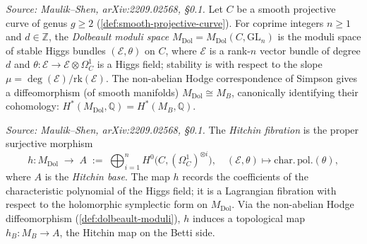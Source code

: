 \begin{definition}[DolbeaultModuli]
  \label{def:dolbeault-moduli}
  \textit{Source: Maulik--Shen, arXiv:2209.02568, §0.1.}
  Let $C$ be a smooth projective curve of genus $g \geq 2$ (\cref{def:smooth-projective-curve}).
  For coprime integers $n \geq 1$ and $d \in \mathbb{Z}$, the \emph{Dolbeault moduli space}
  $M_{\mathrm{Dol}} = M_{\mathrm{Dol}}(C, \mathrm{GL}_n)$ is the moduli space of stable Higgs
  bundles $(\mathcal{E}, \theta)$ on $C$, where $\mathcal{E}$ is a rank-$n$ vector bundle of
  degree $d$ and $\theta \colon \mathcal{E} \to \mathcal{E} \otimes \Omega^1_C$ is a Higgs
  field; stability is with respect to the slope $\mu = \deg(\mathcal{E})/\mathrm{rk}(\mathcal{E})$.
  The non-abelian Hodge correspondence of Simpson gives a diffeomorphism (of smooth manifolds)
  $M_{\mathrm{Dol}} \cong M_B$, canonically identifying their cohomology:
  \(H^*(M_{\mathrm{Dol}}, \mathbb{Q}) = H^*(M_B, \mathbb{Q})\).
\end{definition}

\begin{definition}[HitchinFibration]
  \label{def:hitchin-fibration}
  \textit{Source: Maulik--Shen, arXiv:2209.02568, §0.1.}
  The \emph{Hitchin fibration} is the proper surjective morphism
  \[
    h \colon M_{\mathrm{Dol}} \;\longrightarrow\;
    A \;:=\; \bigoplus_{i=1}^n H^0\!\bigl(C, (\Omega^1_C)^{\otimes i}\bigr),
    \quad (\mathcal{E}, \theta) \mapsto \mathrm{char.\,pol.}(\theta),
  \]
  where $A$ is the \emph{Hitchin base}.  The map $h$ records the coefficients of the
  characteristic polynomial of the Higgs field; it is a Lagrangian fibration with respect to
  the holomorphic symplectic form on $M_{\mathrm{Dol}}$.  Via the non-abelian Hodge
  diffeomorphism (\cref{def:dolbeault-moduli}), $h$ induces a topological map
  $h_B \colon M_B \to A$, the Hitchin map on the Betti side.
\end{definition}


